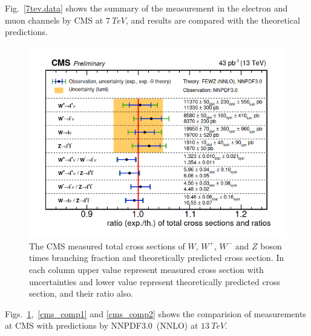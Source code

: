 Fig.~\ref{7tev.data} shows the summary of the measurement in the electron and muon channels by CMS at $7~TeV$, and results are compared with the theoretical predictions. 


\begin{figure}[H]
\centering
\includegraphics[scale=0.5]{chapter3/cms13.png}
\caption{The CMS measured total cross sections of $W$, $W^{+}$, $W^{-}$ and $Z$ boson times branching fraction and theoretically predicted cross section. In each column upper value represent measured cross section with uncertainties and lower value represent theoretically predicted cross section, and their ratio also.~\cite{CMS:2015ois}}       
\label{cms_comp}
\end{figure}
Figs.~\ref{cms_comp},~\ref{cms_comp1} and \ref{cms_comp2} shows the comparision of measurements at CMS with predictions by NNPDF3.0~(NNLO) at $13~TeV$.

